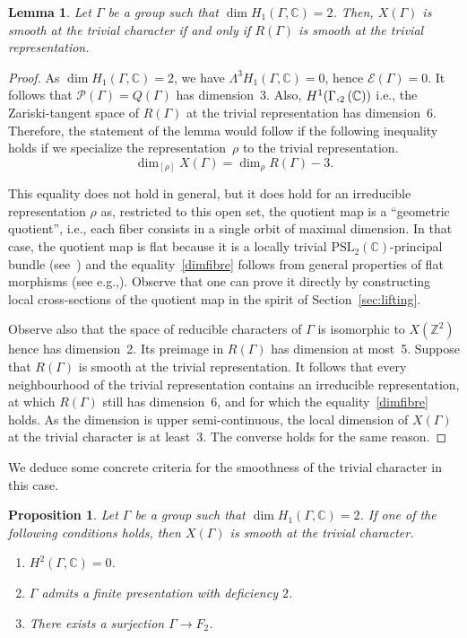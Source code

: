 \documentclass[11pt]{article}
\newcommand{\ie}{i.e.,\xspace}
\newcommand{\eg}{e.g.,\xspace}
\let\mathcal\mathscr
\newcommand{\NoChangel}[1]{%
\expandafter\let\csname old\string#1\endcsname=#1
\let#1=\relax
\newcommand{#1}{\mathcode`l="716C\csname old\string#1\endcsname\mathcode`l="7160 }%
}
\newtheorem{proposition}[theorem]{Proposition}
\newtheorem{lemma}[theorem]{Lemma}
\theoremstyle{definition}
\newcommand{\ZZ}{\mathbb{Z}}
\newcommand{\CC}{\mathbb{C}}
\newcommand{\petitsl}{\mathrm{sl}}\NoChangel{\petitsl}
\begin{document}
\begin{lemma}\label{lem:Rsuffit}
Let $\Gamma$ be a group such that $\dim H_1(\Gamma,\CC)=2$.
Then, $X(\Gamma)$ is smooth at the trivial character if and only if
$R(\Gamma)$ is smooth at the trivial representation.
\end{lemma}
\begin{proof}
As $\dim H_1(\Gamma,\CC)=2$, we have
$\Lambda^3 H_1(\Gamma,\CC)=0$, hence $\mathcal{E}(\Gamma)=0$.
It follows that $\mathcal{P}(\Gamma)=Q(\Gamma)$ has dimension~3.
Also, $H^1(\Gamma,\petitsl_2(\CC))$ \ie the Zariski-tangent
space of $R(\Gamma)$ at the trivial representation has dimension~6.
Therefore, the statement of the lemma would follow if
the following inequality holds if we specialize the representation~$\rho$
to the trivial representation.
\begin{equation}\label{dimfibre}
\dim_{[\rho]} X(\Gamma) = \dim_\rho R(\Gamma)-3.
\end{equation}

This equality does not hold in general, but it does hold for an
irreducible representation $\rho$ as, restricted to this open set, the
quotient map is a ``geometric quotient'', \ie 
each fiber consists in a
single orbit of maximal dimension. In that case, the quotient map is flat
because it is a locally trivial $\mathrm{PSL}_2(\CC)$-principal bundle
(see~\cite[Prop.\,0.9]{GIT}) and the equality~\eqref{dimfibre}
follows from general properties of flat morphisms
(see \eg \cite[Th.\,3.12]{Liu}).
Observe that one can prove it directly
by constructing local cross-sections of the quotient map in the spirit of
Section~\ref{sec:lifting}.

Observe also that the space of reducible characters of $\Gamma$ is
isomorphic to $X(\ZZ^2)$ hence has dimension~2. Its preimage in $R(\Gamma)$
has dimension at most~5. Suppose that $R(\Gamma)$ is smooth at the trivial
representation. It follows that every neighbourhood of the trivial
representation contains an irreducible representation, at which $R(\Gamma)$
still has dimension~6, and for which the equality~\eqref{dimfibre} holds.
As the dimension is upper semi-continuous,
the local dimension of $X(\Gamma)$ at the trivial
character is at least~3. The converse holds for the same reason.
\end{proof}

We deduce some concrete criteria for the smoothness of the trivial
character in this case.

\begin{proposition}\label{criteres}
Let $\Gamma$ be a group such that $\dim H_1(\Gamma,\CC)=2$. If one of the
following conditions holds, then $X(\Gamma)$ is smooth at the trivial
character.
\begin{enumerate}
\item $H^2(\Gamma,\CC)=0$.
\item $\Gamma$ admits a finite presentation with deficiency $2$.
\item There exists a surjection $\Gamma\to F_2$.
\end{enumerate}
\end{proposition}
\end{document}
